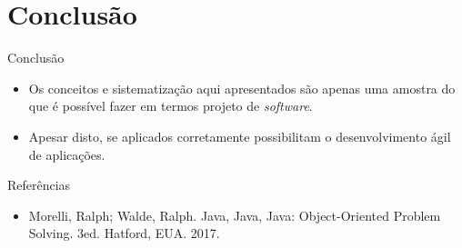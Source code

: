 \documentclass[11pt,justified]{beamer}
\begin{document}
\section{Conclusão}

\begin{frame}{Conclusão}
    \begin{itemize}
        \item Os conceitos e sistematização aqui apresentados são apenas uma amostra do que é possível fazer em termos projeto de \textit{software}.
        \item Apesar disto, se aplicados corretamente possibilitam o desenvolvimento ágil de aplicações.
    \end{itemize}
\end{frame}

\begin{frame}{Referências}
    \begin{itemize}
        \item Morelli, Ralph; Walde, Ralph. Java, Java, Java: Object-Oriented Problem Solving. 3ed. Hatford, EUA. 2017.
    \end{itemize}
\end{frame}
\end{document}
